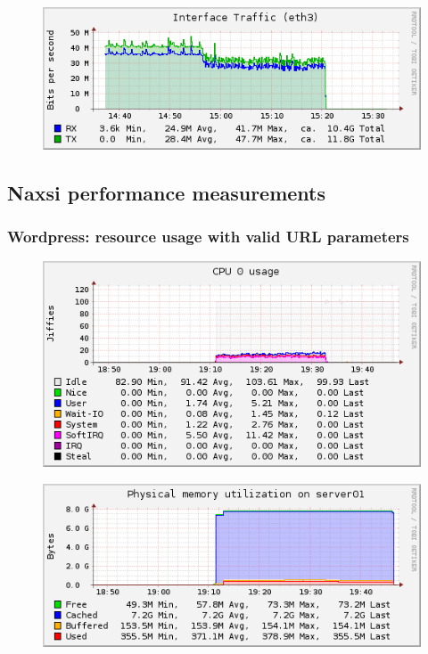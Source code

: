 \documentclass[Measurement results]{subfiles}
\begin{document}
\begin{figure}[H]
\centering
\includegraphics[scale=0.7]{images/results/baseline_200/interface.png}
\end{figure}

\newpage
\subsection{Naxsi performance measurements}
\label{sec:Naxsi performance measurements}

\subsubsection{Wordpress: resource usage with valid URL parameters}
\begin{figure}[H]
\centering
\includegraphics[scale=0.7]{images/results/wp_with_naxsi_incremented_allowed_parameters/cpu.png}
\end{figure}

\begin{figure}[H]
\centering
\includegraphics[scale=0.7]{images/results/wp_with_naxsi_incremented_allowed_parameters/memory.png}
\end{figure}
\end{document}
